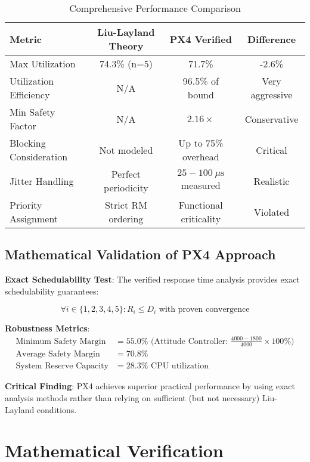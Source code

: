 \documentclass[12pt,a4paper]{article}
\begin{document}
\begin{table}[H]
\centering
\begin{tabular}{|l|c|c|c|}
\hline
\textbf{Metric} & \textbf{Liu-Layland Theory} & \textbf{PX4 Verified} & \textbf{Difference} \\
\hline
Max Utilization & 74.3\% (n=5) & 71.7\% & -2.6\% \\
Utilization Efficiency & N/A & 96.5\% of bound & Very aggressive \\
Min Safety Factor & N/A & $2.16\times$ & Conservative \\
Blocking Consideration & Not modeled & Up to 75\% overhead & Critical \\
Jitter Handling & Perfect periodicity & $25-100\ \mu\text{s}$ measured & Realistic \\
Priority Assignment & Strict RM ordering & Functional criticality & Violated \\
\hline
\end{tabular}
\caption{Comprehensive Performance Comparison}
\end{table}

\subsection{Mathematical Validation of PX4 Approach}

\textbf{Exact Schedulability Test}: The verified response time analysis provides exact schedulability guarantees:

\begin{equation}
\forall i \in \{1,2,3,4,5\}: R_i \leq D_i \text{ with proven convergence}
\end{equation}

\textbf{Robustness Metrics}:
\begin{align}
\text{Minimum Safety Margin} &= 55.0\% \text{ (Attitude Controller: } \frac{4000-1800}{4000} \times 100\%) \\
\text{Average Safety Margin} &= 70.8\% \\
\text{System Reserve Capacity} &= 28.3\% \text{ CPU utilization}
\end{align}

\textbf{Critical Finding}: PX4 achieves superior practical performance by using exact analysis methods rather than relying on sufficient (but not necessary) Liu-Layland conditions.

\section{Mathematical Verification}
\end{document}
